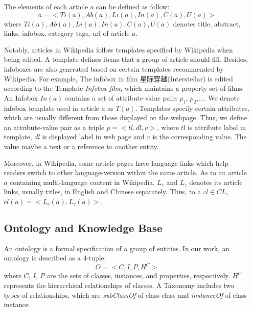 \documentclass[runningheads,a4paper]{llncs}
\begin{document}
\begin{CJK*}{UTF8}{song}
%
The elements of each article $a$ can be defined as follow:
\begin{equation}
    a = <Ti(a),Ab(a),Li(a),In(a),C(a),U(a)>
\end{equation}
where $Ti(a),Ab(a),Li(a),In(a),C(a),U(a)$ denotes title, abstract, links, infobox, category tags, url of article $a$.

Notably, articles in Wikipedia follow templates specified by Wikipedia when being edited. A template defines items that a group of article should fill. Besides, infoboxes are also generated based on certain templates recommended by Wikipedia. For example, The infobox in film 星际穿越(Interstellar) is edited according to the Template \emph{Infobox film}, which maintains a property set of films. An Infobox $In(a)$ contains a set of attribute-value pairs {$p_{1}$, $p_{2}$,...}. We denote infobox template used in article $a$ as $T(a)$. Templates specify certain attributes, which are usually different from those displayed on the webpage. Thus, we define an attribute-value pair as a triple $p=<tl,dl,v>$, where $tl$ is attribute label in template, $dl$ is displayed label in web page and $v$ is the corresponding value. The value maybe a text or a reference to another entity.

Moreover, in Wikipedia, some article pages have language links which help readers switch to other language-version within the same article. %
As to an article $a$ containing multi-language content in Wikipedia, $L_{e}$ and $L_{z}$ denotes its article links, usually titles, in English and Chinese separately. Thus, to a $cl \in CL$, $cl(a) = <L_{e}(a), L_{z}(a)>$.

\subsection{Ontology and Knowledge Base}

An ontology is a formal specification of a group of entities. In our work, an ontology is described as a 4-tuple:
\begin{equation}
    O = <C,I,P,H^C>
\end{equation}
where $C$, $I$, $P$ are the sets of classes, instances, and properties, respectively. $H^C$ represents the hierarchical relationships of classes. A Taxonomy includes two types of relationships, which are \textit{subClassOf} of class-class and \textit{instanceOf} of class-instance.


\end{CJK*}
\end{document}
